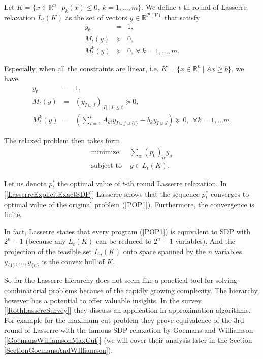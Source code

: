 \documentclass[12pt]{book}
\theoremstyle{definition}
\begin{document}
  Let $K = \{ x\in \mathbb{R}^n \ \vert \ p_k(x)\leq 0, \ k=1,\dots ,m \}$. We define $t$-th round of Lasserre relaxation $L_t(K)$ as the set of vectors $y\in \mathbb{R}^{\mathcal{P}(V)}$ that satisfy
\begin{equation*}
\begin{array}{rcl}
y_\emptyset &=& 1, \\
M_t(y)  &\succeq & 0, \\
M_t^k(y)  &\succeq & 0 , \ \forall \ k=1,\dots ,m.
\end{array}
\end{equation*}

Especially, when all the constraints are linear, i.e. $K = \{ x\in \mathbb{R}^n \ \vert \ Ax\geq b \}$, we have
\begin{equation*}
\begin{array}{rcl}
y_\emptyset &=& 1,\\
M_t(y) &=& (y_{I\cup J})_{\vert I\vert ,\vert J\vert \leq t}\succeq 0,  \\
M_t^k(y) &=& \left(\sum_{i=1}^n A_{ki}y_{I\cup j\cup \{i\}} - b_ky_{I\cup J} \right) \succeq 0, \ \ \forall k=1,\dots m.
\end{array}
\end{equation*}

The relaxed problem then takes form 
\begin{equation}
\label{LasserreRelax}
\begin{array}{ll}
\mbox{minimize } & \sum_\alpha (p_0)_\alpha y_\alpha \\
\mbox{subject to } & y\in L_t(K).
\end{array}
\end{equation}

Let us denote $p^*_t$ the optimal value of $t$-th round Lasserre relaxation. In [\ref{LasserreExplicitExactSDP}] Lasserre shows that the sequence $p^*_t$ converges to optimal value of the original problem (\ref{POP1}). 
Furthermore, the convergence is finite. %

In fact, Lasserre states that every program (\ref{POP1}) is equivalent to SDP  with $2^n-1$ (because any $L_t(K)$ can be reduced to $2^n-1$ variables). And the projection of the feasible set $L_n(K)$ onto space spanned by the $n$ variables $y_{\{1\}}, \dots ,y_{\{n\}}$ is the convex hull of $K$.

So far the Lasserre hierarchy does not seem like a practical tool for solving combinatorial problems because of the rapidly growing complexity. The hierarchy, however has a potential to offer valuable insights. In the survey [\ref{RothLassereSurvey}] they discuss an application in approximation algorithms. For example for the maximum cut problem they prove equivalence of the 3rd round of Lasserre with the famous SDP relaxation by Goemans and Williamson [\ref{GoemansWilliamsonMaxCut}] (we will cover their analysis later in the Section \ref{SectionGoemansAndWIlliamson}).
\end{document}
